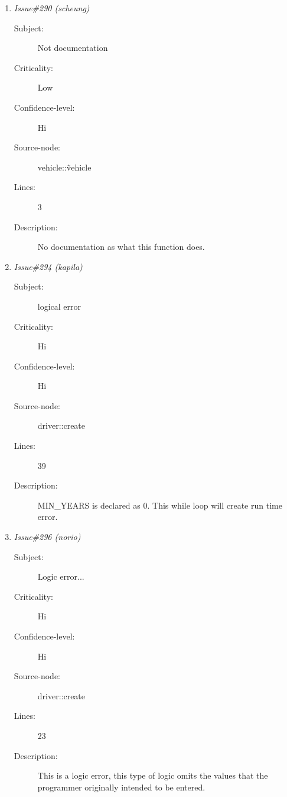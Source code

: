 \begin{enumerate}
\begin{description}
\item [Lines:] 18

\item [Description:] The programmer is trying to tell the compiler that the
 drivers name is equal to the character array userString.
 This command will not copy/move the contents of the array
 into the String name.

 Should be: (strcpy name,userString);
\end{description}
\item {\it Issue\#290 (scheung)}
\begin{description}
\item [Subject:] Not documentation
\item [Criticality:] Low
\item [Confidence-level:] Hi
\item [Source-node:] vehicle::\~vehicle

\item [Lines:] 3

\item [Description:] No documentation as what this function does.
\end{description}
\item {\it Issue\#294 (kapila)}
\begin{description}
\item [Subject:] logical error
\item [Criticality:] Hi
\item [Confidence-level:] Hi
\item [Source-node:] driver::create

\item [Lines:] 39

\item [Description:] MIN\_YEARS is declared as 0. This while loop will create run time error.
\end{description}
\item {\it Issue\#296 (norio)}
\begin{description}
\item [Subject:] Logic error...
\item [Criticality:] Hi
\item [Confidence-level:] Hi
\item [Source-node:] driver::create

\item [Lines:] 23

\item [Description:] This is a logic error, this type of logic omits the values that the
programmer originally intended to be entered.


\end{description}
\end{enumerate}

